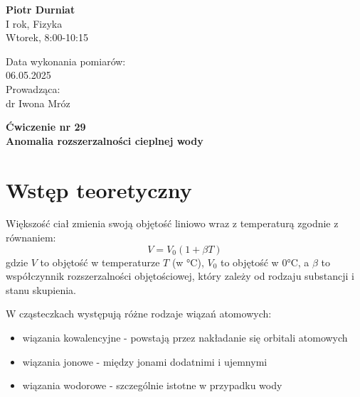 \documentclass[a4paper,12pt]{article}
\begin{document}
\noindent
\begin{minipage}{0.5\textwidth}
    \raggedright
    \textbf{Piotr Durniat} \\
    I rok, Fizyka \\
    Wtorek, 8:00-10:15 \\
    \vspace{0.5cm}
    \vspace{0.5cm}
\end{minipage}%
\begin{minipage}{0.5\textwidth}
    \raggedleft
    Data wykonania pomiarów: \\
    06.05.2025 \\
    \vspace{0.5cm}
    Prowadząca: \\
    dr Iwona Mróz
\end{minipage}

\vspace{2cm}
\begin{center}
    \LARGE \textbf{Ćwiczenie nr 29} \\[0.5cm]
    \Large \textbf{Anomalia rozszerzalności cieplnej wody}
\end{center}

\vspace{1cm}
\noindent

\tableofcontents
\newpage

\section{Wstęp teoretyczny}

Większość ciał zmienia swoją objętość liniowo wraz z temperaturą zgodnie z równaniem:
\begin{equation}
    V = V_0(1 + \beta T)
\end{equation}
gdzie $V$ to objętość w temperaturze $T$ (w °C), $V_0$ to objętość w 0°C, a $\beta$ to współczynnik rozszerzalności objętościowej, który zależy od rodzaju substancji i stanu skupienia.

W cząsteczkach występują różne rodzaje wiązań atomowych:
\begin{itemize}
    \item wiązania kowalencyjne - powstają przez nakładanie się orbitali atomowych
    \item wiązania jonowe - między jonami dodatnimi i ujemnymi
    \item wiązania wodorowe - szczególnie istotne w przypadku wody
\end{itemize}
\end{document}
